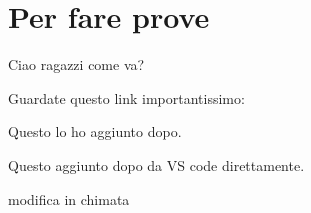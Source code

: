 \chapter{Per fare prove}

Ciao ragazzi come va?

Guardate questo link importantissimo: \citep{provaBibliografia}


Questo lo ho aggiunto dopo.

Questo aggiunto dopo da VS code direttamente.


modifica in chimata